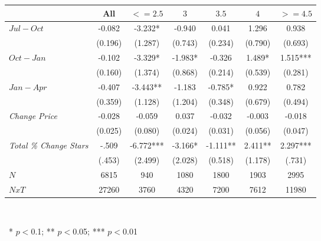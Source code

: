 \begin{center}
\begin{tabular}{lcccccc}
\hline  & All &  $ <=2.5 $  &  $ 3 $  &  $ 3.5 $  &  $ 4 $  &  $ >=4.5$ \\
\hline  $ Jul-Oct $  & -0.082 & -3.232* & -0.940 & 0.041 & 1.296 & 0.938\\
 & (0.196) & (1.287) & (0.743) & (0.234) & (0.790) & (0.693)\\
 $ Oct-Jan $  & -0.102 & -3.329* & -1.983* & -0.326 & 1.489* & 1.515***\\
 & (0.160) & (1.374) & (0.868) & (0.214) & (0.539) & (0.281)\\
 $ Jan-Apr $  & -0.407 & -3.443** & -1.183 & -0.785* & 0.922 & 0.782\\
 & (0.359) & (1.128) & (1.204) & (0.348) & (0.679) & (0.494)\\
 \textit{Change Price}  & -0.028 & -0.059 & 0.037 & -0.032 & -0.003 & -0.018\\
 & (0.025) & (0.080) & (0.024) & (0.031) & (0.056) & (0.047)\\
\hline \textit{Total \% Change Stars} & -.509 & -6.772*** & -3.166* & -1.111** & 2.411** & 2.297***\\
  & (.453) & (2.499) & (2.028) & (0.518) & (1.178) & (.731)\\
\hline  $ N $  & 6815 & 940 & 1080 & 1800 & 1903 & 2995\\
 $ NxT $  & 27260 & 3760 & 4320 & 7200 & 7612 & 11980\\
\hline\end{tabular}\\
\begin{tiny}\ * $p<0$.1; ** $p<0$.05; *** $p<0$.01\end{tiny}\\
\end{center}

